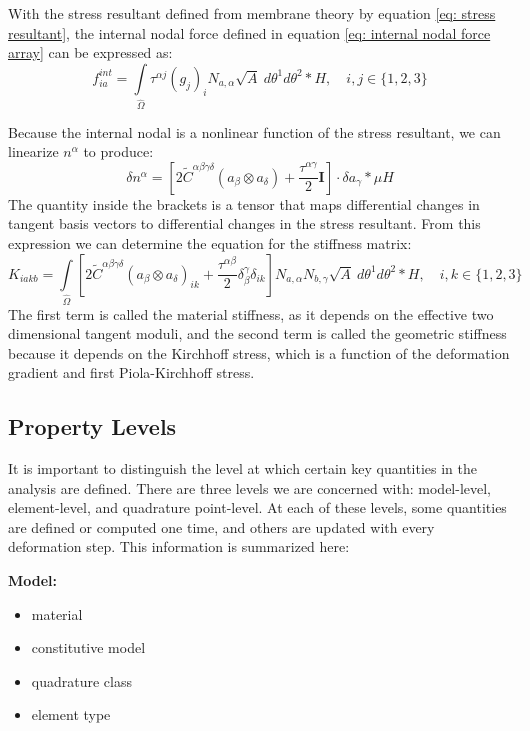 \documentclass[]{spie}  %
\begin{document}
With the stress resultant defined from membrane theory by equation \ref{eq: stress resultant}, the internal nodal force defined in equation \ref{eq: internal nodal force array} can be expressed as:
\begin{equation}
\label{eq: internal nodal force full}
f^{int}_{ia} = \int\limits_{\hat{\Omega}} \tau^{\alpha j} (g_j)_i N_{a,\alpha} \sqrt{A} \ d\theta^1 d\theta^2 * H, \quad i, j \in \{1, 2, 3\}
\end{equation}

Because the internal nodal is a nonlinear function of the stress resultant, we can linearize $n^\alpha$ to produce:
\begin{equation}
\label{eq: linearized stress resultant}
\delta n^\alpha = \left[ 2\tilde{C}^{\alpha\beta\gamma\delta}(a_\beta \otimes a_\delta) + \frac{\tau^{\alpha\gamma}}{2} \bm{I} \right] \cdot \delta a_\gamma * \mu H
\end{equation}
The quantity inside the brackets is a tensor that maps differential changes in tangent basis vectors to differential changes in the stress resultant. From this expression we can determine the equation for the stiffness matrix:
\begin{equation}
\label{eq: stiffness matrix full}
K_{iakb} = \int\limits_{\hat{\Omega}} \left[ 2\tilde{C}^{\alpha\beta\gamma\delta}(a_\beta \otimes a_\delta)_{ik} + \frac{\tau^{\alpha\beta}}{2} \delta^\gamma_\beta \delta_{ik} \right] N_{a,\alpha} N_{b, \gamma} \sqrt{A} \ d\theta^1 d\theta^2 * H, \quad i, k \in \{1, 2, 3\}
\end{equation}
The first term is called the material stiffness, as it depends on the effective two dimensional tangent moduli, and the second term is called the geometric stiffness because it depends on the Kirchhoff stress, which is a function of the deformation gradient and first Piola-Kirchhoff stress. 

\subsection{Property Levels}
\label{sec: property levels}
It is important to distinguish the level at which certain key quantities in the analysis are defined. There are three levels we are concerned with: model-level, element-level, and quadrature point-level. At each of these levels, some quantities are defined or computed one time, and others are updated with every deformation step. This information is summarized here:

\noindent
\textbf{Model:}
\begin{itemize}
	\item material
	\item constitutive model
	\item quadrature class
	\item element type
\end{itemize}
\end{document}
